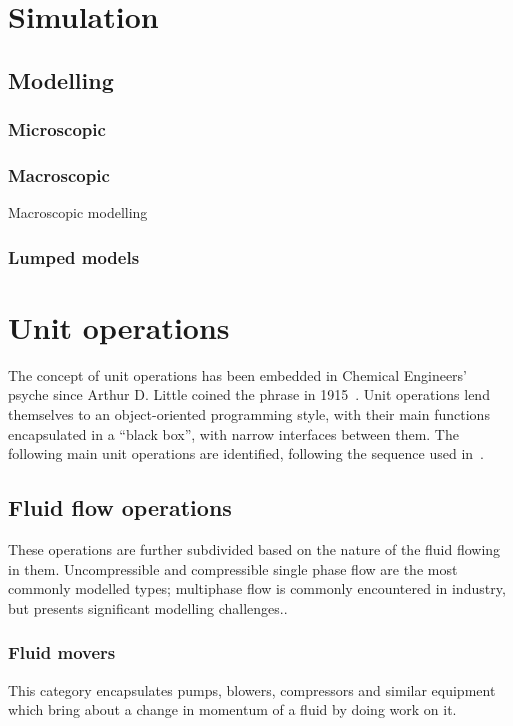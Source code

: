 \section{Simulation}

\subsection{Modelling}
\subsubsection{Microscopic}

\subsubsection{Macroscopic}
Macroscopic modelling 

\subsubsection{Lumped models}


\section{Unit operations}
The concept of unit operations has been embedded in Chemical Engineers' psyche since Arthur D. Little coined the phrase in 1915~\citep{hougen1972seven}.  
Unit operations lend themselves to an object-oriented programming style, with their main functions encapsulated in a ``black box'', with narrow interfaces between them.
The following main unit operations are identified, following the sequence used in~\citet{msh}.

\subsection{Fluid flow operations}
These operations are further subdivided based on the nature of the
fluid flowing in them.  Uncompressible and compressible single phase
flow are the most commonly modelled types; multiphase flow is commonly
encountered in industry, but presents significant modelling
challenges.\citehere.

\subsubsection{Fluid movers}
This category encapsulates pumps, blowers, compressors and similar
equipment which bring about a change in momentum of a fluid by doing
work on it.  

